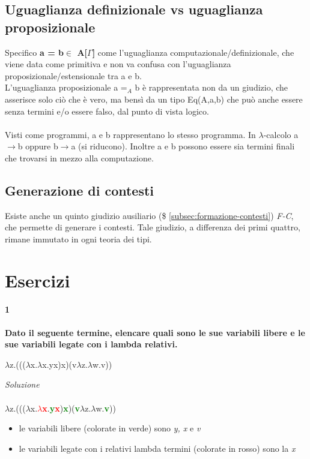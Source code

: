 \documentclass[10pt,a4paper, italian]{book}
\begin{document}
\subsection{Uguaglianza definizionale vs uguaglianza proposizionale}
\label{subsec:uguaglianza-computazionale-proposizionale}
Specifico \textbf{a = b$\in$ A[$\Gamma$]} come l'uguaglianza computazionale/definizionale, che viene data come primitiva e non va confusa con l'uguaglianza proposizionale/estensionale tra a e b.\\L'uguaglianza proposizionale a =$_A$ b \`e rappresentata non da un giudizio, che asserisce solo ci\`o che \`e vero, ma bens\`i da un tipo Eq(A,a,b) che pu\`o anche essere senza termini e/o essere falso, dal punto di vista logico.\\\\
Visti come programmi, a e b rappresentano lo stesso programma. In $\lambda$-calcolo a$\rightarrow$b oppure b$\rightarrow$a (si riducono). Inoltre a e b possono essere sia termini finali che trovarsi in mezzo alla computazione.
\subsection{Generazione di contesti}
\label{subsec:generazione-di-contesti}
Esiste anche un quinto giudizio ausiliario (\$ \ref{subsec:formazione-contesti}) \textit{F-C}, che permette di generare i contesti. Tale giudizio, a differenza dei primi quattro, rimane immutato in ogni teoria dei tipi.

\section{Esercizi}
\label{sec:esercizi-cap2}
\paragraph{1} 
\textbf{Dato il seguente termine, elencare quali sono le sue variabili libere e le sue variabili legate con i lambda relativi.}
\begin{center}$\lambda$z.((($\lambda$x.$\lambda$x.yx)x)(v$\lambda$z.$\lambda$w.v))\end{center}
\textit{Soluzione}\\\\
$\lambda$z.((($\lambda$x.\textbf{\textcolor{red}{$\lambda$x}}.\textbf{\textcolor{green}{y}\textcolor{red}{x}})\textbf{\textcolor{green}{x}})(\textbf{\textcolor{green}{v}}$\lambda$z.$\lambda$w.\textbf{\textcolor{green}{v}}))
\begin{itemize}
\item le variabili libere (colorate in verde) sono \textit{y, x} e \textit{v}
\item le variabili legate con i relativi lambda termini (colorate in rosso) sono la \textit{x}
\end{itemize}
\end{document}
